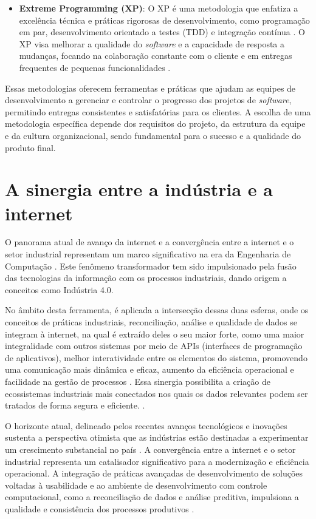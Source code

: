 \begin{itemize}
	\item \textbf{Extreme Programming (XP)}: O XP é uma metodologia que enfatiza a excelência técnica e práticas rigorosas de desenvolvimento, como programação em par, desenvolvimento orientado a testes (TDD) e integração contínua \cite{extremeprogramming}. O XP visa melhorar a qualidade do \textit{software} e a capacidade de resposta a mudanças, focando na colaboração constante com o cliente e em entregas frequentes de pequenas funcionalidades \cite{tddxp}.

\end{itemize}

Essas metodologias oferecem ferramentas e práticas que ajudam as equipes de desenvolvimento a gerenciar e controlar o progresso dos projetos de \textit{software}, permitindo entregas consistentes e satisfatórias para os clientes. A escolha de uma metodologia específica depende dos requisitos do projeto, da estrutura da equipe e da cultura organizacional, sendo fundamental para o sucesso e a qualidade do produto final.

\section{A sinergia entre a indústria e a internet}

O panorama atual de avanço da internet e a convergência entre a internet e o setor industrial representam um marco significativo na era da Engenharia de Computação \cite{industry4status}. Este fenômeno transformador tem sido impulsionado pela fusão das tecnologias da informação com os processos industriais, dando origem a conceitos como Indústria 4.0.

No âmbito desta ferramenta, é aplicada a intersecção dessas duas esferas, onde os conceitos de práticas industriais, reconciliação, análise e qualidade de dados se integram à internet, na qual é extraído deles o seu maior forte, como uma maior integralidade com outros sistemas por meio de APIs (interfaces de programação de aplicativos), melhor interatividade entre os elementos do sistema, promovendo uma comunicação mais dinâmica e eficaz, aumento da eficiência operacional e facilidade na gestão de processos \cite{industry4}. Essa sinergia possibilita a criação de ecossistemas industriais mais conectados nos quais os dados relevantes podem ser tratados de forma segura e eficiente. \cite{industrybuild}.

O horizonte atual, delineado pelos recentes avanços tecnológicos e inovações sustenta a perspectiva otimista que as indústrias estão destinadas a experimentar um crescimento substancial no país \cite{industrychina}. A convergência entre a internet e o setor industrial representa um catalisador significativo para a modernização e eficiência operacional. A integração de práticas avançadas de desenvolvimento de soluções voltadas à usabilidade e ao ambiente de desenvolvimento com controle computacional, como a reconciliação de dados e análise preditiva, impulsiona a qualidade e consistência dos processos produtivos \cite{industrydigital}.

